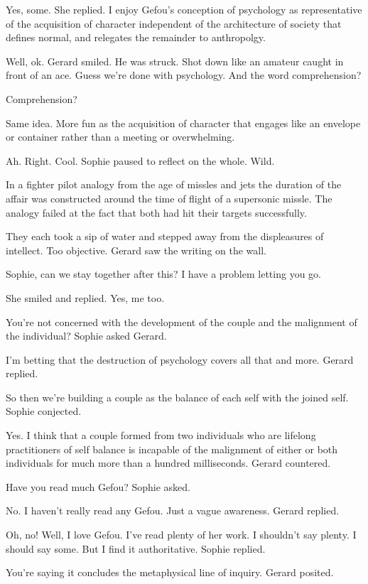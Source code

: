 Yes, some.  She replied.  I enjoy Gefou's conception of psychology as
representative of the acquisition of character independent of the
architecture of society that defines normal, and relegates the
remainder to anthropolgy.

Well, ok.  Gerard smiled.  He was struck.  Shot down like an amateur
caught in front of an ace.  Guess we're done with psychology.  And the
word comprehension?

Comprehension?

Same idea.  More fun as the acquisition of character that engages like
an envelope or container rather than a meeting or overwhelming.  

Ah.  Right.  Cool.  Sophie paused to reflect on the whole.  Wild.  

In a fighter pilot analogy from the age of missles and jets the
duration of the affair was constructed around the time of flight of a
supersonic missle.  The analogy failed at the fact that both had hit
their targets successfully.

They each took a sip of water and stepped away from the displeasures
of intellect.  Too objective.  Gerard saw the writing on the wall.

Sophie, can we stay together after this?  I have a problem letting you
go.

She smiled and replied.  Yes, me too.



You're not concerned with the development of the couple and the
malignment of the individual?  Sophie asked Gerard.

I'm betting that the destruction of psychology covers all that and
more.  Gerard replied.

So then we're building a couple as the balance of each self with the
joined self.  Sophie conjected.

Yes.  I think that a couple formed from two individuals who are
lifelong practitioners of self balance is incapable of the malignment
of either or both individuals for much more than a hundred
milliseconds.  Gerard countered.

Have you read much Gefou?  Sophie asked.

No.  I haven't really read any Gefou.  Just a vague awareness.  Gerard
replied.

Oh, no!  Well, I love Gefou.  I've read plenty of her work.  I
shouldn't say plenty.  I should say some.  But I find it
authoritative.  Sophie replied.

You're saying it concludes the metaphysical line of inquiry.  Gerard
posited.

